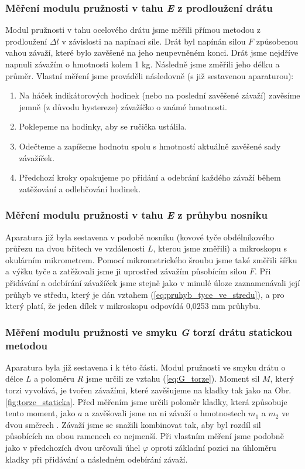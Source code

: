 \documentclass[english]{article}
\begin{document}
			\subsubsection{Měření modulu pružnosti v tahu \emph{E} z prodloužení drátu}
					Modul pružnosti v tahu ocelového drátu jsme měřili přímou metodou z prodloužení $\Delta l$ v závislosti na napínací síle. Drát byl napínán silou $F$ způsobenou vahou závaží, které bylo zavěšené na jeho neupevněném konci. Drát jsme nejdříve napnuli závažím o hmotnosti kolem 1 kg. Následně jsme změřili jeho délku a průměr. Vlastní měření jsme prováděli následovně (s již sestavenou aparaturou):
					\begin{enumerate}
							\item Na háček indikátorových hodinek (nebo na poslední zavěšené závaží) zavěsíme jemně (z důvodu hystereze) závažíčko o známé hmotnosti.
							\item Poklepeme na hodinky, aby se ručička ustálila. 
							\item Odečteme a zapíšeme hodnotu spolu s hmotností aktuálně zavěšené sady závažíček.
							\item Předchozí kroky opakujeme po přidání a odebrání každého závaží během zatěžování a odlehčování hodinek.
					\end{enumerate}
			
			\subsubsection{Měření modulu pružnosti v tahu \emph{E} z průhybu nosníku}
					Aparatura již byla sestavena v podobě nosníku (kovové tyče obdélníkového průřezu na dvou břitech ve vzdálenosti $L$, kterou jsme změřili) a mikroskopu s okulárním mikrometrem. Pomocí mikrometrického šroubu jsme také změřili šířku a výšku tyče a zatěžovali jsme ji uprostřed závažím působícím silou $F$. Při přidávání a odebírání závažíček jsme stejně jako v minulé úloze zaznamenávali její průhyb ve středu, který je dán vztahem (\ref{eq:pruhyb_tyce_ve_stredu}), a pro který platí, že jeden dílek  v mikroskopu odpovídá 0,0253 mm průhybu. 
			
			\subsubsection{Měření modulu pružnosti ve smyku \emph{G} torzí drátu statickou metodou}
					Aparatura byla již sestavena i k této části. Modul pružnosti ve smyku drátu o délce $L$ a poloměru $R$ jsme určili ze vztahu (\ref{eq:G_torze}). Moment sil $M$, který torzi vyvolává, je tvořen závažími, které zavěšujeme na kladky tak jako na Obr. \ref{fig:torze_staticka}. Před měřením jsme určili poloměr kladky, která způsobuje tento moment, jako $a$ a zavěšovali jsme na ni závaží o hmotnostech $m_1$ a $m_2$ ve dvou směrech . Závaží jsme se snažili kombinovat tak, aby byl rozdíl sil působících na obou ramenech co nejmenší. Při vlastním měření jsme podobně jako v předchozích dvou určovali úhel $\varphi$ oproti základní pozici na úhloměru kladky při přidávání a následném odebírání závaží.
			
\end{document}
